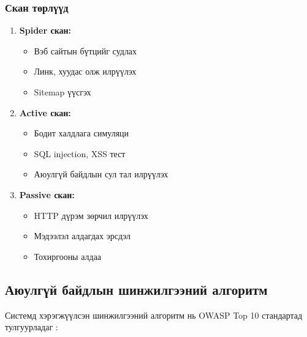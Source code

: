 \documentclass[main.tex]{subfiles}
\begin{document}
\subsubsection{Скан төрлүүд}
\begin{enumerate}
    \item \textbf{Spider скан:}
    \begin{itemize}
        \item Вэб сайтын бүтцийг судлах
        \item Линк, хуудас олж илрүүлэх
        \item Sitemap үүсгэх
    \end{itemize}
    
    \item \textbf{Active скан:}
    \begin{itemize}
        \item Бодит халдлага симуляци
        \item SQL injection, XSS тест
        \item Аюулгүй байдлын сул тал илрүүлэх
    \end{itemize}
    
    \item \textbf{Passive скан:}
    \begin{itemize}
        \item HTTP дүрэм зөрчил илрүүлэх
        \item Мэдээлэл алдагдах эрсдэл
        \item Тохиргооны алдаа
    \end{itemize}
\end{enumerate}

\subsection{Аюулгүй байдлын шинжилгээний алгоритм}

Системд хэрэгжүүлсэн шинжилгээний алгоритм нь OWASP Top 10 стандартад тулгуурладаг \cite{3}:
\end{document}
